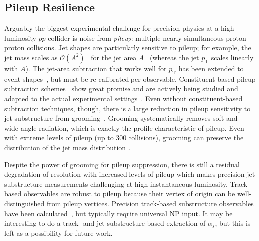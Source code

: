 %
%
%


\subsection{Pileup Resilience}

Arguably the biggest experimental challenge for precision physics at a high luminosity $pp$ collider is noise from \textit{pileup}: multiple nearly simultaneous proton-proton collisions.
%
Jet shapes are particularly sensitive to pileup; for example, the jet mass scales as $\mathcal{O}(A^2)$~\cite{Salam:2009jx} for the jet area $A$~\cite{Cacciari:2008gn} (whereas the jet $p_\text{T}$ scales linearly with $A$).
%
The jet-area subtraction that works well for $p_\text{T}$ has been extended to event shapes~\cite{Soyez:2012hv}, but must be re-calibrated per observable.
%
Constituent-based pileup subtraction schemes~\cite{Cacciari:2014gra,Krohn:2013lba,Bertolini:2014bba,Berta:2014eza,Komiske:2017ubm} show great promise and are actively being studied and adapted to the actual experimental settings~\cite{CMS-PAS-JME-14-001,CMS-DP-2015-034,ATLAS-CONF-2017-065,ATL-PHYS-PUB-2017-020,Aad:2015ina}.
%
Even without constituent-based subtraction techniques, though, there is a large reduction in pileup sensitivity to jet substructure from grooming~\cite{CMS-PAS-JME-14-001,Aad:2015rpa,Aad:2015ina,Altheimer:2013yza}.
%
Grooming systematically removes soft and wide-angle radiation, which is exactly the profile characteristic of pileup.
%
Even with extreme levels of pileup (up to 300 collisions), grooming can preserve the distribution of the jet mass distribution~\cite{JetSubstructureECFA2014}. 

Despite the power of grooming for pileup suppression, there is still a residual degradation of resolution with increased levels of pileup which makes precision jet substructure measurements challenging at high instantaneous luminosity.
%
Track-based observables are robust to pileup because their vertex of origin can be well-distinguished from pileup vertices.
%
Precision track-based substructure observables have been calculated~\cite{Krohn:2012fg,Waalewijn:2012sv,Chang:2013rca,Elder:2017bkd}, but typically require universal NP input.
%
It may be interesting to do a track- and jet-substructure-based extraction of $\alpha_s$, but this is left as a possibility for future work.
